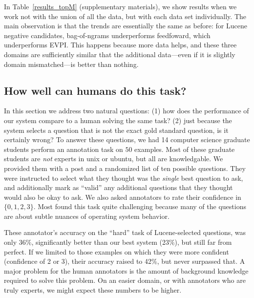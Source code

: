 \documentclass[11pt,a4paper]{article}
\begin{document}
In Table~\ref{results_topM} (supplementary materials), we show results when we work not with the union of all the data, but with each data set individually.
The main observation is that the trends are essentially the same as before: for Lucene negative candidates, bag-of-ngrams underperforms feedfoward, which underperforms EVPI.
This happens because more data helps, and these three domains are sufficiently similar that the additional data---even if it is slightly domain mismatched---is better than nothing.

\subsection{How well can humans do this task?}

In this section we address two natural questions:
(1) how does the performance of our system compare to a human solving the same task?
(2) just because the system selects a question that is not the exact gold standard question, is it certainly wrong?
To answer these questions, we had 14 computer science graduate students perform an annotation task on $50$ examples.
Most of these graduate students are \emph{not} experts in unix or ubuntu, but all are knowledgable.
We provided them with a post and a randomized list of ten possible questions.
They were instructed to select what they thought was the \emph{single} best question to ask, and additionally mark as ``valid'' any additional questions that they thought would also be okay to ask.
We also asked annotators to rate their confidence in $\{0,1,2,3\}$.
Most found this task quite challenging because many of the questions are about subtle nuances of operating system behavior.

These annotator's accuracy on the ``hard'' task of Lucene-selected questions, was only 36\%, significantly better than our best system (23\%), but still far from perfect.
If we limited to those examples on which they were more confident (confidence of 2 or 3), their accuracy raised to 42\%, but never surpassed that.
A major problem for the human annotators is the amount of background knowledge required to solve this problem.
On an easier domain, or with annotators who are truly experts, we might expect these numbers to be higher.
\end{document}
